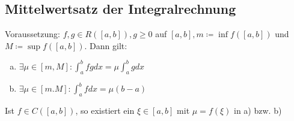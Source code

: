 \subsection{Mittelwertsatz der Integralrechnung}
Voraussetzung: $f,g \in R([a,b]), g \geq 0$ auf $[a,b], m \coloneqq \inf f([a,b])$ und $M \coloneqq \sup f([a,b])$. Dann gilt: \\
\begin{enumerate} [a)]
    \item $\exists \mu \in [m,M]: \int_a^b fg dx = \mu \int_a^b g dx$
    \item $\exists \mu \in [m.M]: \int_a^b f dx = \mu (b-a)$
\end{enumerate}
Ist $f \in C([a,b])$, so existiert ein $\xi \in [a,b]$ mit $\mu = f(\xi)$ in a) bzw. b)